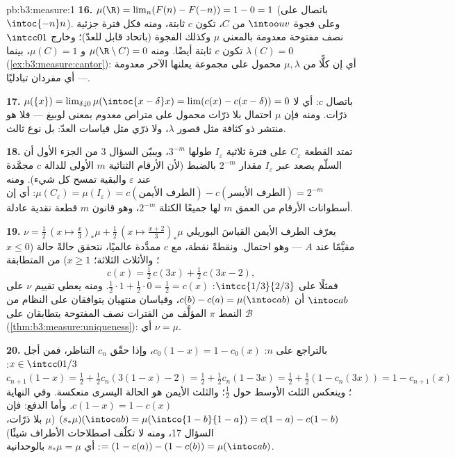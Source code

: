 \begin{solution}{pb:b3:measure:1}
\textbf{16.} $\mu(\R) = \lim_n(F(n) - F(-n)) = 1 - 0 = 1$ (باتصال  على $\intoc{-n}n$). وعلى
فجوة $\intoo uv$ من $C$، تكون $c$ ثابتة، ومنه فكل فترة جزئية نصف
مفتوحة معدومة  بالمعنى $\mu$ وكذلك الفجوة (باتحاد قابل للعدّ)؛
وخارج $\intcc01$ تكون $c$ ثابتة أيضًا. ومنه $\mu(\R\setminus C) = 0$ و
$\mu(C) = 1$، بينما $\lambda(C) =
0$ (\cref{ex:b3:measure:cantor}): أي إن كلًّا من
$\mu, \lambda$ محمول على مجموعة يعلنها الآخر معدومة  ---
أي مفردان تبادليًا.

\textbf{17.} $\mu(\{x\}) = \lim_{\delta\downarrow0}
\mu(\intoc{x-\delta}x) = \lim(c(x) - c(x-\delta)) = 0$ باتصال $c$: أي لا ذرّات. ومنه فإن $\mu$
 احتمال بلا ذرّات محمول على متراص معدوم  بمعنى لوبيغ
--- فلا هو منتشر ذو كثافة مثل قصور $\lambda$، ولا ذرّي مثل
قياسات العدّ: بل نوع ثالث.

\textbf{18.} تمتد القطعة $C_\varepsilon$ على فترة ثلاثية
$I_\varepsilon$ طولها $3^{-m}$، ويبيّن السؤال 3 من الجزء الأول أن
السلّم يصعد عبر $I_\varepsilon$ مقدار $2^{-m}$ بالضبط (لأن
الأرقام الثنائية $m$ الأولى للدالة $c$ مجمَّدة عند $\varepsilon$
والبقية تمسح كل شيء). ومنه $\mu(C_\varepsilon) = \mu(I_\varepsilon) =
c(\text{الطرف الأيمن}) - c(\text{الطرف الأيسر}) = 2^{-m}$: أي إن أسطوانات الأرقام من
العمق $m$ لها جميعًا الكتلة $2^{-m}$، وهو قانون $m$ قطعة نقدية
عادلة.

\textbf{19.} يعرّف الطرف الأيمن القياسَ البوريلي $\nu = \frac12\,(x \mapsto \tfrac x3)_*\mu + \frac12\,(x
\mapsto \tfrac{x+2}3)_*\mu$ مقيَّمًا
عند $A$ --- وهو  احتمال. ونقطةً نقطة، مع $c$ ممدَّدة عالميًا،
نتحقق حالةً حالة ($x \leq 0$؛ والأثلاث الثلاثة؛ $x \geq 1$) من
المتطابقة
\[
c(x) = \tfrac12\,c(3x) + \tfrac12\,c(3x - 2),
\]
فمثلًا على $\intcc{1/3}{2/3}$: $\frac12\cdot1 + \frac12\cdot0 =
\frac12 = c(x)$. ومنه يعطي تقييم $\nu$ على
$\intoc ab$ أن $c(b) - c(a) = \mu(\intoc ab)$، وقياسان منتهيان يتوافقان على النظام من
النمط $\pi$ المؤلَّف من الفترات نصف المفتوحة يتطابقان على
$\mathcal B$ (\cref{thm:b3:measure:uniqueness}): أي $\nu =
\mu$.

\textbf{20.} بالتراجع على $n$: $c_0(1-x) = 1 - c_0(x)$، وإذا حقّق $c_n$ التناظر،
فمن أجل $x \in
\intcc0{1/3}$: $c_{n+1}(1 - x) = \frac12 + \frac12c_n(3(1-x)
- 2) = \frac12 + \frac12c_n(1 - 3x) = \frac12 + \frac12(1 -
c_n(3x)) = 1 - c_{n+1}(x)$؛ وينعكس الثلث الأوسط حول $\frac12$؛
والثلث الأيمن هو الحالة اليسرى منعكسة. وفي النهاية $c(1-x) = 1 - c(x)$. وأما
الدفع: فإن $(s_*\mu)(\intoc ab)
= \mu(\intco{1-b}{1-a}) = c(1-a) - c(1-b)$ ($\mu$ بلا ذرّات، السؤال 17، ومنه لا تكلّف
اصطلاحات الأطراف شيئًا) $= (1 -
c(a)) - (1 - c(b)) = \mu(\intoc ab)$: أي $s_*\mu = \mu$ بالوحدانية.


\end{solution}
